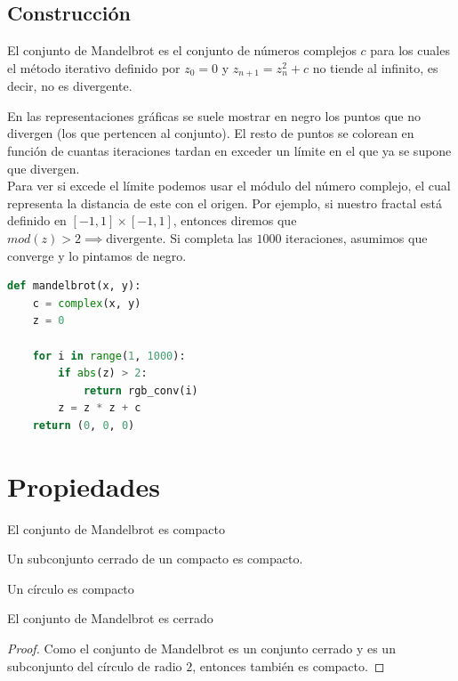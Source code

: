 \subsection{Construcción}

\begin{definition}
    El conjunto de Mandelbrot es el conjunto de números complejos $c$ para los cuales el método iterativo definido por $z_0 = 0$ y $z_{n+1} = z_n^2 + c$ no tiende al infinito, es decir, no es divergente.\cite{Medina_2011}
\end{definition}

\noindent En las representaciones gráficas se suele mostrar en negro los puntos que no divergen (los que pertencen al conjunto). El resto de puntos se colorean en función de cuantas iteraciones tardan en exceder un límite en el que ya se supone que divergen.\\

\noindent Para ver si excede el límite podemos usar el módulo del número complejo, el cual representa la distancia de este con el origen. Por ejemplo, si nuestro fractal está definido en $[-1,1] \times [-1,1]$, entonces diremos que $mod(z)>2 \implies \text{divergente}$.
Si completa las $1000$ iteraciones, asumimos que converge y lo pintamos de negro.\\

\begin{lstlisting}[language=Python]
def mandelbrot(x, y):
    c = complex(x, y)
    z = 0

    for i in range(1, 1000):
        if abs(z) > 2:
            return rgb_conv(i)
        z = z * z + c
    return (0, 0, 0)
\end{lstlisting}

\section{Propiedades}

\begin{theorem}
    El conjunto de Mandelbrot es compacto
\end{theorem}

\begin{lemma}
    Un subconjunto cerrado de un compacto es compacto.
\end{lemma}

\begin{lemma}
    Un círculo es compacto
\end{lemma}

\begin{lemma}
    El conjunto de Mandelbrot es cerrado
\end{lemma}

\begin{proof}
    Como el conjunto de Mandelbrot es un conjunto cerrado y es un subconjunto del círculo de radio $2$, entonces también es compacto.
\end{proof}

